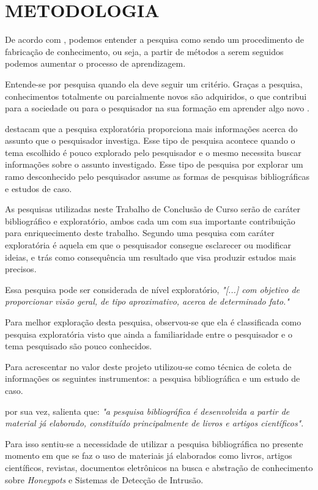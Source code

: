 \chapter{METODOLOGIA}
De acordo com , podemos entender a pesquisa como sendo um procedimento de fabricação de conhecimento, ou seja, a partir de métodos a serem seguidos podemos aumentar o processo de aprendizagem.

Entende-se por pesquisa quando ela deve seguir um critério. Graças a pesquisa, conhecimentos totalmente ou parcialmente novos são adquiridos, o que contribui para a sociedade ou para o pesquisador na sua formação em aprender algo novo \cite{gil2008}.

 destacam que a pesquisa exploratória proporciona mais informações acerca do assunto que o pesquisador investiga. Esse tipo de pesquisa acontece quando o tema escolhido é pouco explorado pelo pesquisador e o mesmo necessita buscar informações sobre o assunto investigado. Esse tipo de pesquisa por explorar um ramo desconhecido pelo pesquisador assume as formas de pesquisas bibliográficas e estudos de caso.

As pesquisas utilizadas neste Trabalho de Conclusão de Curso serão de caráter bibliográfico e exploratório, ambos cada um com sua importante contribuição para enriquecimento deste trabalho. Segundo  uma pesquisa com caráter exploratória é aquela em que o pesquisador consegue esclarecer ou modificar ideias, e trás como consequência um resultado que visa produzir estudos mais precisos.

Essa pesquisa pode ser considerada de nível exploratório, \textit{"[...] com objetivo de proporcionar visão geral, de tipo aproximativo, acerca de determinado fato."} \cite{gil1999}

Para melhor exploração desta pesquisa, observou-se que ela é classificada como pesquisa exploratória visto que ainda a familiaridade entre o pesquisador e o tema pesquisado são pouco conhecidos.

Para acrescentar no valor deste projeto utilizou-se como técnica de coleta de informações os seguintes instrumentos: a pesquisa bibliográfica e um estudo de caso.

 por sua vez, salienta que: \textit{"a pesquisa bibliográfica é desenvolvida a partir de material já elaborado, constituído principalmente de livros e artigos científicos"}.

Para isso sentiu-se a necessidade de utilizar a pesquisa bibliográfica no presente momento em que se faz o uso de materiais já elaborados como livros, artigos científicos, revistas, documentos eletrônicos na busca e abstração de conhecimento sobre \textit{Honeypots} e Sistemas de Detecção de Intrusão.


